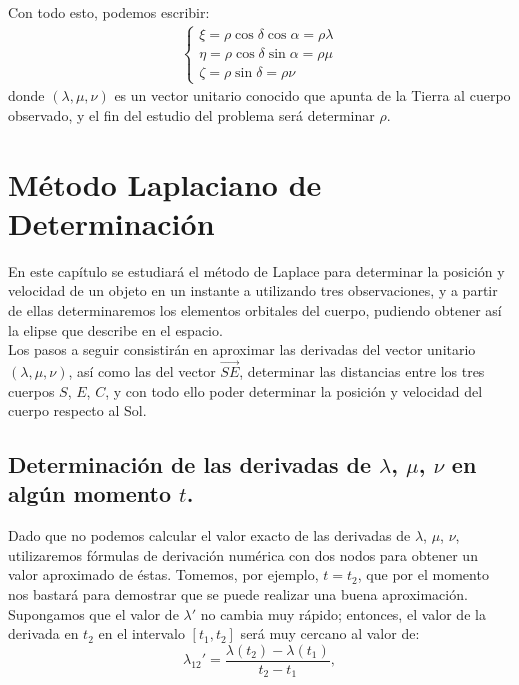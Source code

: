 \documentclass[11pt]{book}
\begin{document}
Con todo esto, podemos escribir:
\begin{align}
\left\{
\begin{array}{l}
\xi = \rho \cos{\delta}\cos{\alpha} = \rho\lambda\\
\eta = \rho \cos{\delta}\sin{\alpha} = \rho\mu\\
\zeta = \rho \sin{\delta} = \rho\nu
\end{array}
\right.
\label{eq:terminologia}
\end{align}
\noindent donde $(\lambda,\mu,\nu)$ es un vector unitario conocido que apunta de la Tierra al cuerpo observado, y el fin del estudio del problema será determinar $\rho$.\\
\newpage
\thispagestyle{empty}













\chapter{Método Laplaciano de Determinación}
En este capítulo se estudiará el método de Laplace para determinar la posición y velocidad de un objeto en un instante a utilizando tres observaciones, y a partir de ellas determinaremos los elementos orbitales del cuerpo, pudiendo obtener así la elipse que describe en el espacio.\\

Los pasos a seguir consistirán en aproximar las derivadas del vector unitario $(\lambda,\mu,\nu)$, así como las del vector $\vec{SE}$, determinar las distancias entre los tres cuerpos $S$, $E$, $C$, y con todo ello poder determinar la posición y velocidad del cuerpo respecto al Sol.\\

\section{Determinación de las derivadas de $\lambda$, $\mu$, $\nu$ en algún momento $t$.}
\label{sec:primera_segunda_derivada}
Dado que no podemos calcular el valor exacto de las derivadas de $\lambda$, $\mu$, $\nu$, utilizaremos fórmulas de derivación numérica con dos nodos para obtener un valor aproximado de éstas. Tomemos, por ejemplo, $t=t_2$, que por el momento nos bastará para demostrar que se puede realizar una buena aproximación. Supongamos que el valor de $\lambda'$ no cambia muy rápido; entonces, el valor de la derivada en $t_2$ en el intervalo $[t_1,t_2]$ será muy cercano al valor de:
\[
\lambda_{12}'=\frac{\lambda(t_2)-\lambda(t_1)}{t_2-t_1},
\]
\end{document}
